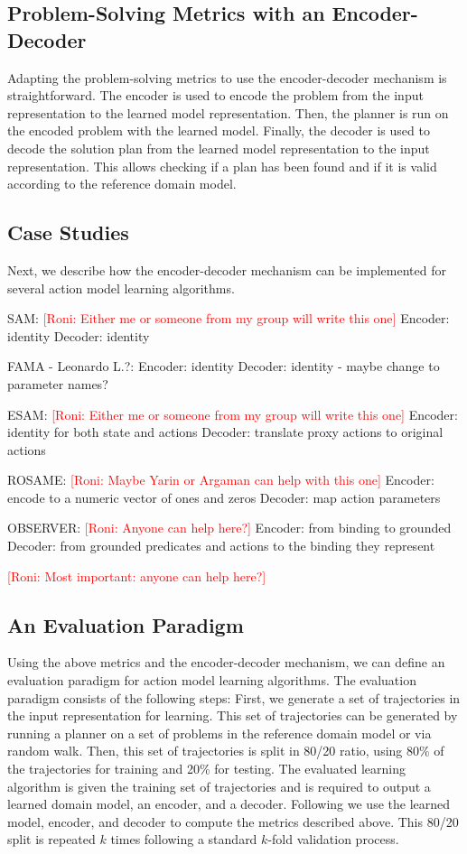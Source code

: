 \documentclass{article}
\theoremstyle{definition}
\theoremstyle{remark}
\newcommand{\roni}[1]{{\textcolor{red}{[Roni: #1]}}}
\begin{document}
\subsection{Problem-Solving Metrics with an Encoder-Decoder}

Adapting the problem-solving metrics to use the encoder-decoder mechanism is straightforward.
The encoder is used to encode the problem from the input representation to the learned model representation. 
Then, the planner is run on the encoded problem with the learned model. 
Finally, the decoder is used to decode the solution plan from the learned model representation to the input representation. 
This allows checking if a plan has been found and if it is valid according to the reference domain model. 


\subsection{Case Studies}
Next, we describe how the encoder-decoder mechanism can be implemented for several action model learning algorithms. 

SAM: \roni{Either me or someone from my group will write this one}
Encoder: identity
Decoder: identity

FAMA - Leonardo L.?:
Encoder: identity
Decoder: identity - maybe change to parameter names?

ESAM: \roni{Either me or someone from my group will write this one}
Encoder: identity for both state and actions     
Decoder: translate proxy actions to original actions

ROSAME: \roni{Maybe Yarin or Argaman can help with this one}
Encoder: encode to a numeric vector of ones and zeros
Decoder: map action parameters

OBSERVER: \roni{Anyone can help here?}
Encoder: from binding to grounded
Decoder: from grounded predicates and actions to the binding they represent

\roni{Most important: anyone can help here?}


\subsection{An Evaluation Paradigm}
Using the above metrics and the encoder-decoder mechanism, we can define an evaluation paradigm for action model learning algorithms.
The evaluation paradigm consists of the following steps: 
First, we generate a set of trajectories in the input representation for learning. 
This set of trajectories can be generated by running a planner on a set of problems in the reference domain model or via random walk.
Then, this set of trajectories is split in 80/20 ratio, using 80\% of the trajectories for training and 20\% for testing. 
The evaluated learning algorithm is given the training set of trajectories and is required to output a learned domain model, an encoder, and a decoder. 
Following we use the learned model, encoder, and decoder to compute the metrics described above. 
This 80/20 split is repeated $k$ times following a standard $k$-fold validation process. 
\end{document}
